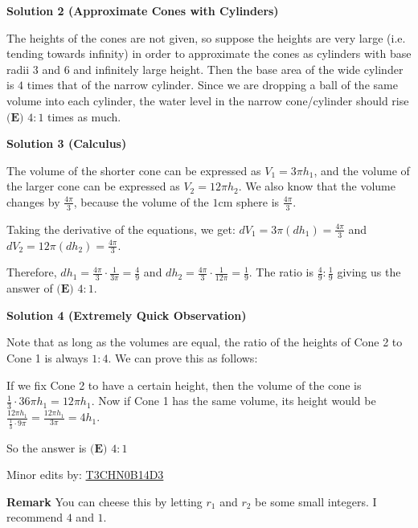 \begin{enumerate}
 



\textbf{Solution 2 (Approximate Cones with Cylinders)}

The heights of the cones are not given, so suppose the heights are very large (i.e. tending towards infinity) in order to approximate the cones as cylinders with base radii $3$ and $6$ and infinitely large height. Then the base area of the wide cylinder is $4$ times that of the narrow cylinder. Since we are dropping a ball of the same volume into each cylinder, the water level in the narrow cone/cylinder should rise $\boxed{\textbf{(E) } 4:1}$ times as much.

 



\textbf{Solution 3 (Calculus)}

The volume of the shorter cone can be expressed as $V_1=3\pi h_1$, and the volume of the larger cone can be expressed as $V_2=12\pi h_2$. We also know that the volume changes by $\frac{4\pi}{3}$, because the volume of the $1$cm sphere is $\frac{4\pi}{3}$.

 Taking the derivative of the equations, we get: $dV_1=3\pi(dh_1)=\frac{4\pi}{3}$ and $dV_2=12\pi(dh_2)=\frac{4\pi}{3}$.

 Therefore, $dh_1=\frac{4\pi}{3}\cdot\frac{1}{3\pi}=\frac{4}{9}$ and $dh_2=\frac{4\pi}{3}\cdot\frac{1}{12\pi}=\frac{1}{9}$. The ratio is $\frac{4}{9}:\frac{1}{9}$ giving us the answer of $\boxed{\textbf{(E) }4:1}$.

 



\textbf{Solution 4 (Extremely Quick Observation)}

Note that as long as the volumes are equal, the ratio of the heights of Cone 2 to Cone 1 is always $1:4$. We can prove this as follows:

 If we fix Cone 2 to have a certain height, then the volume of the cone is $\frac{1}{3}\cdot36\pi{h_1}=12\pi{h_1}$. Now if Cone 1 has the same volume, its height would be $\frac{12\pi{h_1}}{\frac{1}{3}\cdot9\pi}=\frac{12\pi{h_1}}{3\pi}=4h_1$.

 So the answer is $\boxed{\textbf{(E) } 4 : 1}$

 Minor edits by: \href{https://artofproblemsolving.com/wiki/index.php?title=User:T3chn0b14d3&action=edit&redlink=1}{T3CHN0B14D3}

 \textbf{Remark} You can cheese this by letting $r_1$ and $r_2$ be some small integers. I recommend $4$ and $1.$


\end{enumerate}
